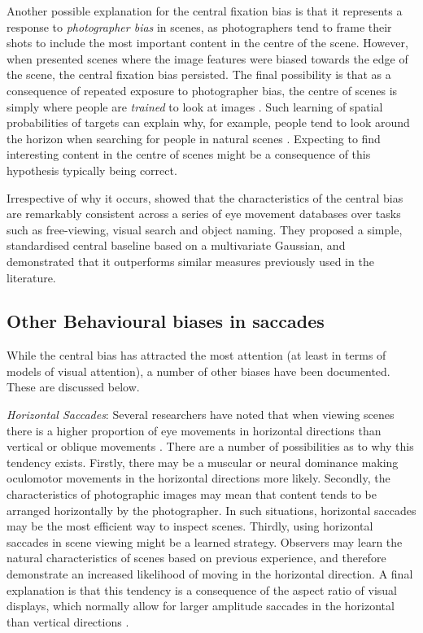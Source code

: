 Another possible explanation for the central fixation bias is that it represents a response to \emph{photographer bias} in scenes, as photographers tend to frame their shots to include the most important content in the centre of the scene. However, when \cite{tatler2007} presented scenes where the image features were biased towards the edge of the scene, the central fixation bias persisted. The final possibility is that as a consequence of repeated exposure to photographer bias, the centre of scenes is simply where people are \emph{trained} to look at images \citep{parkhurst2002}. Such learning of spatial probabilities of targets can explain why, for example, people tend to look around the horizon when searching for people in natural scenes \citep{birmingham2009, torralba2006, ehinger2009}. Expecting to find interesting content in the centre of scenes might be a consequence of this hypothesis typically being correct. 

Irrespective of why it occurs, \cite{clarke-tatler2014} showed that the characteristics of the central bias are remarkably consistent across a series of eye movement databases over tasks such as free-viewing, visual search and object naming. They proposed a simple, standardised central baseline based on a multivariate Gaussian, and demonstrated that it outperforms similar measures previously used in the literature.

\subsection{Other Behavioural biases in saccades}
While the central bias has attracted the most attention (at least in terms of models of visual attention), a number of other biases have been documented. These are discussed below. 

\textit{Horizontal Saccades}: Several researchers have noted that when viewing scenes there is a higher proportion of eye movements in horizontal directions than vertical or oblique movements \citep[e.g.][]{gilchrist2006,foulsham2008,tatler2008,lappe1998,lee2002}. There are a number of possibilities as to why this tendency exists. Firstly, there may be a muscular or neural dominance making oculomotor movements in the horizontal directions more likely. Secondly, the characteristics of photographic images may mean that content tends to be arranged horizontally by the photographer. In such situations, horizontal saccades may be the most efficient way to inspect scenes. Thirdly, using horizontal saccades in scene viewing might be a learned strategy. Observers may learn the natural characteristics of scenes based on previous experience, and therefore demonstrate an increased likelihood of moving in the horizontal direction. A final explanation is that this tendency is a consequence of the aspect ratio of visual displays, which normally allow for larger amplitude saccades in the horizontal than vertical directions \citep{wartburg2007}.

